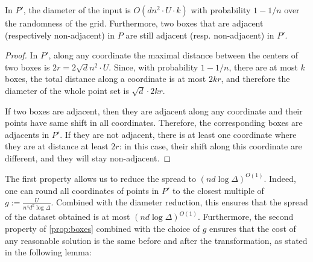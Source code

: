 \begin{proposition}\label{prop:boxes}
In $P'$, the diameter of the input is $O(d n^2\cdot U \cdot k)$ with probability $1-1/n$ over the randomness of the grid.
Furthermore, two boxes that are adjacent (respectively non-adjacent) in $P$  are still adjacent (resp. non-adjacent) in $P'$.
\end{proposition}
\begin{proof}
In $P'$, along any
coordinate the maximal distance between the centers of two boxes is $2r = 2\sqrt d n^2\cdot U$. Since, with probability $1-1/n$, there are at most $k$ boxes, the total distance along a coordinate is at most $2kr$, and therefore the diameter of the whole point set is $\sqrt{d} \cdot 2kr$.

If two boxes are adjacent, then they are adjacent along any coordinate and their points have same shift in all coordinates. Therefore, the corresponding boxes are adjacents in $P'$. If they are not adjacent, there is at least one coordinate where they are at distance at least $2r$: in this case, their shift along this coordinate are different, and they will stay non-adjacent.
\end{proof}


The first property allows us to reduce the spread to $(nd \log \Delta)^{O(1)}$.  Indeed, one can round all coordinates of points in $P'$ to the closest multiple of
$g := \frac{U}{n^4 d^{2} \log \Delta}$.
Combined with the diameter reduction, this ensures that the spread of the dataset obtained is at most $(nd \log \Delta)^{O(1)}$. 
Furthermore, the second property of \cref{prop:boxes} combined with the choice of $g$ ensures that the cost of any reasonable solution is the same before and after the transformation, as stated in the following lemma:

